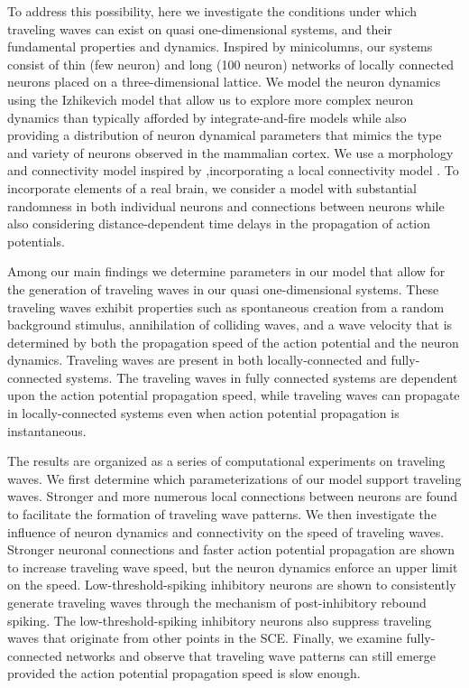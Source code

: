 To address this possibility, here we investigate the conditions under which traveling waves can exist on quasi one-dimensional systems, and their fundamental properties and dynamics.  
Inspired by minicolumns, our systems consist of thin (few neuron) and long (100 neuron) networks of locally connected neurons placed on a three-dimensional lattice.  
We model the neuron dynamics using the Izhikevich model \citep{izhikevich2003} that allow us to explore more complex neuron dynamics than typically afforded by integrate-and-fire models \citep{keane2015}\citep{Senk2020} while also providing a distribution of neuron dynamical parameters that mimics the type and variety of neurons observed in the mammalian cortex.
We use a morphology and connectivity model inspired by \citet{maass2002},incorporating a local connectivity model \citep{Levy2012}\citep{Pyle2017}\citep{Fino2011}.
To incorporate elements of a real brain, we consider a model with substantial randomness in both individual neurons and connections between neurons while also considering  distance-dependent time delays in the propagation of action potentials.

Among our main findings we determine parameters in our model that allow for the generation of traveling waves in our quasi one-dimensional systems. 
These traveling waves exhibit properties such as spontaneous creation from a random background stimulus, annihilation of colliding waves, and a wave velocity that is determined by both the propagation speed of the action potential and the neuron dynamics.
Traveling waves are present in both locally-connected and fully-connected systems. 
The traveling waves in fully connected systems are dependent upon the action potential propagation speed, while traveling waves can propagate in locally-connected systems even when action potential propagation is instantaneous.

The results are organized as a series of computational experiments on traveling waves.
We first determine which parameterizations of our model support traveling waves.
Stronger and more numerous local connections between neurons are found to facilitate the formation of traveling wave patterns.
We then investigate the influence of neuron dynamics and connectivity on the speed of traveling waves.
Stronger neuronal connections and faster action potential propagation are shown to increase traveling wave speed, but the neuron dynamics enforce an upper limit on the speed. 
Low-threshold-spiking inhibitory neurons are shown to consistently generate traveling waves through the mechanism of post-inhibitory rebound spiking.
The low-threshold-spiking inhibitory neurons also suppress traveling waves that originate from other points in the SCE.
Finally, we examine fully-connected networks and observe that traveling wave patterns can still emerge provided the action potential propagation speed is slow enough.

